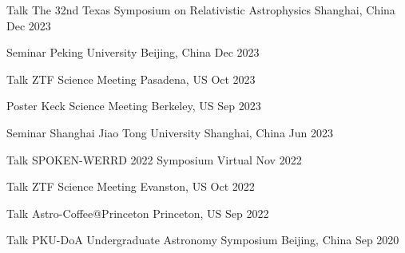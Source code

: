 \begin{cventries}
	\cvsimsimpentry
	{Talk}
	{The 32nd Texas Symposium on Relativistic Astrophysics}
	{Shanghai, China}
	{Dec 2023}

	\cvsimsimpentry
	{Seminar}
	{Peking University}
	{Beijing, China}
	{Dec 2023}

	\cvsimsimpentry
	{Talk}
	{ZTF Science Meeting}
	{Pasadena, US}
	{Oct 2023}
	
	\cvsimsimpentry
	{Poster}
	{Keck Science Meeting}
	{Berkeley, US}
	{Sep 2023}

	\cvsimsimpentry
	{Seminar}
	{Shanghai Jiao Tong University}
	{Shanghai, China}
	{Jun 2023}

	\cvsimsimpentry
	{Talk}
	{SPOKEN-WERRD 2022 Symposium} %
	{Virtual} %
	{Nov 2022} %

	\cvsimsimpentry
	{Talk} %
	{ZTF Science Meeting} %
	{Evanston, US} %
	{Oct 2022} %

	\cvsimsimpentry
	{Talk} %
	{Astro-Coffee@Princeton} %
	{Princeton, US} %
	{Sep 2022} %
	
	\cvsimsimpentry
	{Talk} %
	{PKU-DoA Undergraduate Astronomy Symposium} %
	{Beijing, China} %
	{Sep 2020} %

\end{cventries}